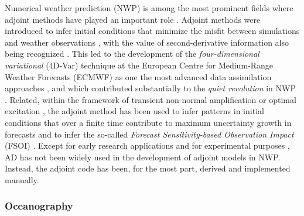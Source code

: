 Numerical weather prediction (NWP) is among the most prominent fields where adjoint methods have played an important role \cite{Errico_1997}. 
Adjoint methods were introduced to infer initial conditions that minimize the misfit between simulations and weather observations \cite{Lewis.1985,Talagrand.1987,Courtier.1987}, with the value of second-derivative information also being recognized \cite{Dimet.2002}. 
This led to the development of the \textit{four-dimensional variational} (4D-Var) technique at the European Centre for Medium-Range Weather Forecasts (ECMWF) as one the most advanced data assimilation approaches \cite{Rabier.1992,Rabier:2000uu}, and which contributed substantially to the \textit{quiet revolution} in NWP \cite{Bauer.2015}.
Related, within the framework of transient non-normal amplification or optimal excitation \cite{Farrell.1988,Farrell:1996jx}, the adjoint method has been used to infer patterns in initial conditions that over a finite time contribute to maximum uncertainty growth in forecasts \cite{Palmer:1994br,Buizza:1995in} and to infer the so-called \textit{Forecast Sensitivity-based Observation Impact} (FSOI) \cite{Langland:2004jo}.
Except for early research applications \cite{Park.1996,Park.2000} and for experimental purposes \cite{Giering.2006}, AD has not been widely used in the development of adjoint models in NWP.
Instead, the adjoint code has been, for the most part, derived and implemented manually.

\subsubsection{Oceanography}

